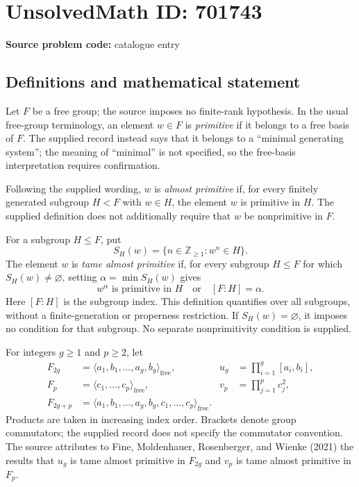 \documentclass[11pt]{article}
\begin{document}
\section*{UnsolvedMath ID: 701743}
\textbf{Source problem code:} catalogue entry
\subsection{Definitions and mathematical statement}
Let \(F\) be a free group; the source imposes no finite-rank hypothesis. In the usual free-group terminology, an element \(w\in F\) is \emph{primitive} if it belongs to a free basis of \(F\). The supplied record instead says that it belongs to a ``minimal generating system''; the meaning of ``minimal'' is not specified, so the free-basis interpretation requires confirmation.

Following the supplied wording, \(w\) is \emph{almost primitive} if, for every finitely generated subgroup \(H<F\) with \(w\in H\), the element \(w\) is primitive in \(H\). The supplied definition does not additionally require that \(w\) be nonprimitive in \(F\).

For a subgroup \(H\le F\), put
\[
 S_H(w)=\{n\in\mathbb Z_{\ge1}:w^n\in H\}.
\]
The element \(w\) is \emph{tame almost primitive} if, for every subgroup \(H\le F\) for which \(S_H(w)\ne\varnothing\), setting \(\alpha=\min S_H(w)\) gives
\[
 w^\alpha\text{ is primitive in }H
 \quad\text{or}\quad
 [F:H]=\alpha.
\]
Here \([F:H]\) is the subgroup index. This definition quantifies over all subgroups, without a finite-generation or properness restriction. If \(S_H(w)=\varnothing\), it imposes no condition for that subgroup. No separate nonprimitivity condition is supplied.

For integers \(g\ge1\) and \(p\ge2\), let
\[
\begin{aligned}
 F_{2g}&=\langle a_1,b_1,\ldots,a_g,b_g\rangle_{\mathrm{free}},
 &u_g&=\prod_{i=1}^{g}[a_i,b_i],\\
 F_p&=\langle c_1,\ldots,c_p\rangle_{\mathrm{free}},
 &v_p&=\prod_{j=1}^{p}c_j^2,\\
 F_{2g+p}&=\langle a_1,b_1,\ldots,a_g,b_g,c_1,\ldots,c_p\rangle_{\mathrm{free}}.
\end{aligned}
\]
Products are taken in increasing index order. Brackets denote group commutators; the supplied record does not specify the commutator convention. The source attributes to Fine, Moldenhauer, Rosenberger, and Wienke (2021) the results that \(u_g\) is tame almost primitive in \(F_{2g}\) and \(v_p\) is tame almost primitive in \(F_p\).
\end{document}
